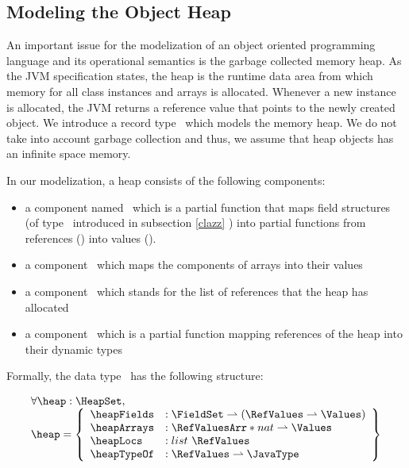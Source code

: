 

 \subsection{Modeling the Object Heap} \label{heap}
 An important issue for the modelization of an object oriented programming language and its operational semantics
 is the garbage collected memory heap. As the JVM specification states, the heap is the
 runtime data area from which memory  for all class instances and arrays is allocated. Whenever a new instance
 is allocated, the JVM returns a reference value that points to the newly created object. 
 We introduce a record type \HeapSet \ which models the memory heap. We do not take into account 
 garbage collection and thus, we assume that heap objects has an infinite space memory. 
 
 In our modelization, a heap consists of the following components:
 \begin{itemize}
       \item a component  named \heapFields \ which is a partial function that maps field
             structures (of type \FieldSet \ introduced in subsection \ref{clazz} ) into partial functions from references (\AllRefs)
	     into values (\Values).  
 

       \item  a component \heapArrays \ which maps the components of arrays  into their values

       \item  a component  \heapLocs  \ which stands for the  list of references that the heap has allocated  
       
       \item  a component  \heapTypeOf  \ which is a partial function mapping references of the heap
	       into their dynamic types 
 \end{itemize}


 Formally, the data type \HeapSet \ has the following structure:



  $$ \begin{array}{l}
         \forall  \heap : \HeapSet , \\
         \heap = \left\{\begin{array}{ll}  \heapFields &  : \FieldSet \rightharpoonup (  \RefValues \rightharpoonup \Values) \\
                                           \heapArrays &  : \RefValuesArr * nat \rightharpoonup \Values \\
					   \heapLocs   &  : list \ \RefValues \\
					   \heapTypeOf     &  : \RefValues \rightharpoonup \JavaType
                    \end{array} \right\}
   \end{array} $$


